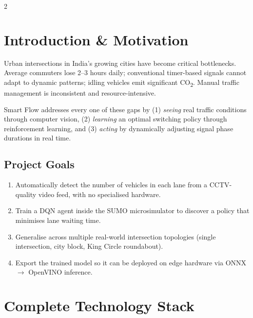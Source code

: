 \documentclass[10pt, a4paper]{article}
\begin{document}
\raggedcolumns
\begin{multicols}{2}

\section{Introduction \& Motivation}

Urban intersections in India's growing cities have become critical
bottlenecks. Average commuters lose 2--3 hours daily; conventional
timer-based signals cannot adapt to dynamic patterns; idling vehicles emit
significant CO\textsubscript{2}. Manual traffic management is inconsistent
and resource-intensive.

Smart Flow addresses every one of these gaps by (1) \textit{seeing} real
traffic conditions through computer vision, (2) \textit{learning} an optimal
switching policy through reinforcement learning, and (3) \textit{acting} by
dynamically adjusting signal phase durations in real time.

\subsection{Project Goals}
\begin{enumerate}
  \item Automatically detect the number of vehicles in each lane from a
        CCTV-quality video feed, with no specialised hardware.
  \item Train a DQN agent inside the SUMO microsimulator to discover a
        policy that minimises lane waiting time.
  \item Generalise across multiple real-world intersection topologies
        (single intersection, city block, King Circle roundabout).
  \item Export the trained model so it can be deployed on edge hardware
        via ONNX $\to$ OpenVINO inference.
\end{enumerate}

\section{Complete Technology Stack}


\end{multicols}
\end{document}
